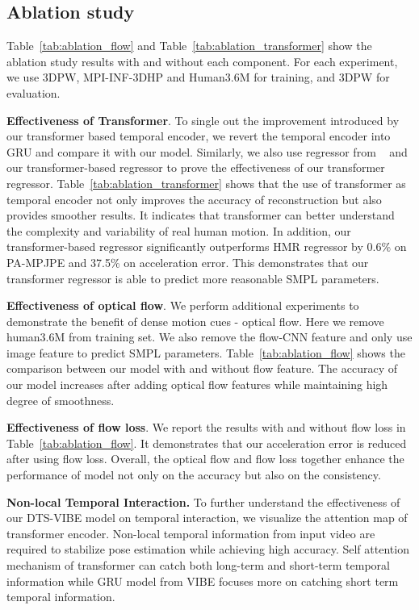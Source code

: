 \documentclass[10pt,twocolumn,letterpaper]{article}
\begin{document}
\subsection{Ablation study}
Table~\ref{tab:ablation_flow} and Table~\ref{tab:ablation_transformer} show the ablation study results with and without each component. For each experiment, we use 3DPW, MPI-INF-3DHP and Human3.6M for training, and 3DPW for evaluation.

\textbf{Effectiveness of Transformer}. To single out the improvement introduced by our transformer based temporal encoder, we revert the temporal encoder into GRU and compare it with our model. Similarly, we also use regressor from ~\cite{kanazawa2018end} and our transformer-based regressor to prove the effectiveness of our transformer regressor. Table~\ref{tab:ablation_transformer} shows that the use of transformer as temporal encoder not only improves the accuracy of reconstruction but also provides smoother results. It indicates that transformer can better understand the complexity and variability of real human motion.
In addition, our transformer-based regressor significantly outperforms HMR regressor by 0.6\% on PA-MPJPE and 37.5\% on acceleration error. This demonstrates that our transformer regressor is able to predict more reasonable SMPL parameters.

\textbf{Effectiveness of optical flow}. We perform additional experiments to demonstrate the benefit of dense motion cues - optical flow. Here we remove human3.6M from training set. We also remove the flow-CNN feature and only use image feature to predict SMPL parameters. Table~\ref{tab:ablation_flow} shows the comparison between our model with and without flow feature. The accuracy of our model increases after adding optical flow features while maintaining high degree of smoothness.

\textbf{Effectiveness of flow loss}. We report the results with and without flow loss in Table~\ref{tab:ablation_flow}. It demonstrates that our acceleration error is reduced after using flow loss. Overall, the optical flow and flow loss together enhance the performance of model not only on the accuracy but also on the consistency. 

\textbf{Non-local Temporal Interaction.} To further understand the effectiveness of our DTS-VIBE model on temporal interaction, we visualize the attention map of transformer encoder. Non-local temporal information from input video are required to stabilize pose estimation while achieving high accuracy. Self attention mechanism of transformer can catch both long-term and short-term temporal information while GRU model from VIBE\cite{kocabas2020vibe} focuses more on catching short term temporal information.
\end{document}
